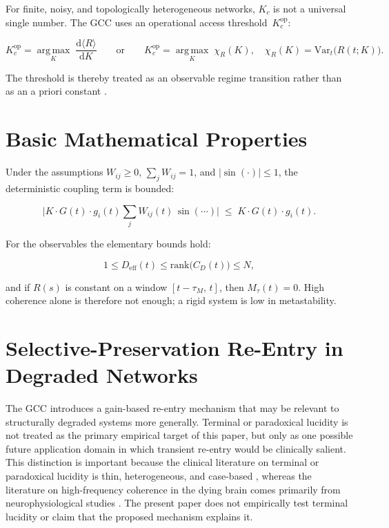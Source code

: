 ﻿\documentclass[11pt,a4paper]{article}
\theoremstyle{plain}
\theoremstyle{definition}
\theoremstyle{remark}
\newcommand{\Deff}{D_{\mathrm{eff}}}
\newcommand{\Mtau}{M_{\tau}}
\newcommand{\Kcop}{K_c^{\mathrm{op}}}
\begin{document}
For finite, noisy, and topologically heterogeneous networks, $K_c$ is not a universal single number. The GCC uses an operational access threshold~$\Kcop$:

\begin{equation}
\label{eq:Kcop}
\Kcop = \operatorname*{arg\,max}_{K}\;\frac{\mathrm{d}\langle R \rangle}{\mathrm{d}K}
\qquad\text{or}\qquad
\Kcop = \operatorname*{arg\,max}_{K}\;\chi_R(K), \quad \chi_R(K) = \mathrm{Var}_t\!\bigl(R(t;K)\bigr).
\end{equation}

The threshold is thereby treated as an observable regime transition rather than as an a priori constant \citep{restrepo2005}.


\section{Basic Mathematical Properties}
\label{sec:grundsaetze}

Under the assumptions $W_{ij} \geq 0$, $\sum_j W_{ij} = 1$, and $|\sin(\cdot)| \leq 1$, the deterministic coupling term is bounded:

\begin{equation}
\bigl|K \cdot G(t) \cdot g_i(t) \sum_j W_{ij}(t)\,\sin(\cdots)\bigr| \;\leq\; K \cdot G(t) \cdot g_i(t).
\end{equation}

For the observables the elementary bounds hold:

\begin{equation}
1 \leq \Deff(t) \leq \mathrm{rank}\bigl(C_D(t)\bigr) \leq N,
\end{equation}

and if $R(s)$ is constant on a window $[t-\tau_M,\,t]$, then $\Mtau(t) = 0$. High coherence alone is therefore not enough; a rigid system is low in metastability.


\section{Selective-Preservation Re-Entry in Degraded Networks}
\label{sec:TL}

The GCC introduces a gain-based re-entry mechanism that may be relevant to structurally degraded systems more generally. Terminal or paradoxical lucidity is not treated as the primary empirical target of this paper, but only as one possible future application domain in which transient re-entry would be clinically salient. This distinction is important because the clinical literature on terminal or paradoxical lucidity is thin, heterogeneous, and case-based \citep{nahm2012,mashour2019,gilmore2023}, whereas the literature on high-frequency coherence in the dying brain comes primarily from neurophysiological studies \citep{borjigin2013}. The present paper does not empirically test terminal lucidity or claim that the proposed mechanism explains it.
\end{document}
